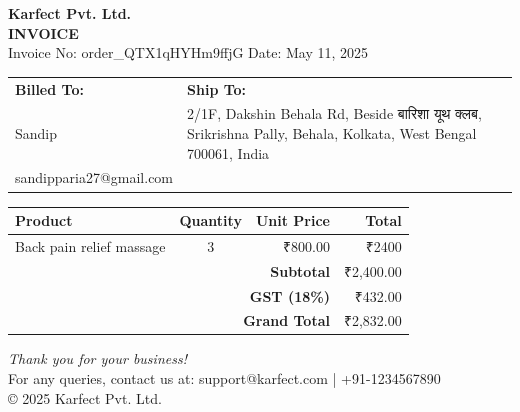 \documentclass[a4paper,12pt]{article}
\begin{document}
    \begin{center}
        \textbf{\Large Karfect Pvt. Ltd.} \\
        \vspace{0.2cm}
        \textbf{INVOICE} \\
        \vspace{0.2cm}
        Invoice No: order_QTX1qHYHm9ffjG \quad Date: May 11, 2025
    \end{center}

    \vspace{1cm}

    \begin{tabular}{@{}p{} p{}@{}}
        \textbf{Billed To:} & \textbf{Ship To:} \\
        Sandip & 2/1F, Dakshin Behala Rd, Beside बारिशा यूथ क्लब, Srikrishna Pally, Behala, Kolkata, West Bengal 700061, India \\
        sandipparia27@gmail.com & \\
    \end{tabular}

    \vspace{1cm}

    \begin{center}
        \begin{tabular}{|l|c|r|r|}
            \hline
            \textbf{Product} & \textbf{Quantity} & \textbf{Unit Price} & \textbf{Total} \\ \hline
            
            Back pain relief massage & 3 & ₹800.00 & ₹2400 \\ \hline
        
            \multicolumn{3}{|r|}{\textbf{Subtotal}} & ₹2,400.00 \\ \hline
            \multicolumn{3}{|r|}{\textbf{GST (18\%)}} & ₹432.00 \\ \hline
            \multicolumn{3}{|r|}{\textbf{Grand Total}} & ₹2,832.00 \\ \hline
        \end{tabular}
    \end{center}

    \vspace{1cm}

    \begin{center}
        \textit{Thank you for your business!} \\
        \vspace{0.5cm}
        For any queries, contact us at: support@karfect.com | +91-1234567890 \\
        © 2025 Karfect Pvt. Ltd.
    \end{center}

    
\end{document}
